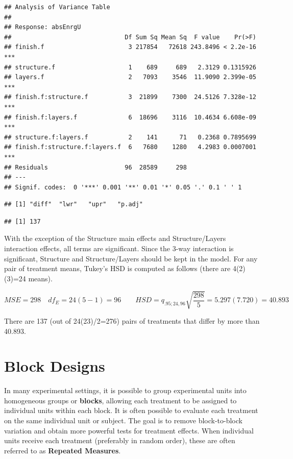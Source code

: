\documentclass[
]{book}
\begin{document}
\begin{verbatim}
## Analysis of Variance Table
## 
## Response: absEnrgU
##                               Df Sum Sq Mean Sq  F value    Pr(>F)    
## finish.f                       3 217854   72618 243.8496 < 2.2e-16 ***
## structure.f                    1    689     689   2.3129 0.1315926    
## layers.f                       2   7093    3546  11.9090 2.399e-05 ***
## finish.f:structure.f           3  21899    7300  24.5126 7.328e-12 ***
## finish.f:layers.f              6  18696    3116  10.4634 6.608e-09 ***
## structure.f:layers.f           2    141      71   0.2368 0.7895699    
## finish.f:structure.f:layers.f  6   7680    1280   4.2983 0.0007001 ***
## Residuals                     96  28589     298                       
## ---
## Signif. codes:  0 '***' 0.001 '**' 0.01 '*' 0.05 '.' 0.1 ' ' 1
\end{verbatim}

\begin{verbatim}
## [1] "diff"  "lwr"   "upr"   "p.adj"
\end{verbatim}

\begin{verbatim}
## [1] 137
\end{verbatim}

With the exception of the Structure main effects and Structure/Layers
interaction effects, all terms are significant. Since the 3-way
interaction is significant, Structure and Structure/Layers should be
kept in the model. For any pair of treatment means, Tukey's HSD is
computed as follows (there are 4(2)(3)=24 means).

\[
MSE = 298 \quad df_E=24(5-1)=96 \qquad
HSD = q_{.95;24,96}\sqrt{\frac{298}{5}}=5.297(7.720)=40.893
\]

There are 137 (out of 24(23)/2=276) pairs of treatments that differ by
more than 40.893.

\chapter{Block Designs}\label{block-designs}

In many experimental settings, it is possible to group experimental
units into homogeneous groups or \textbf{blocks}, allowing each
treatment to be assigned to individual units within each block. It is
often possible to evaluate each treatment on the same individual unit or
subject. The goal is to remove block-to-block variation and obtain more
powerful tests for treatment effects. When individual units receive each
treatment (preferably in random order), these are often referred to as
\textbf{Repeated Measures}.
\end{document}
